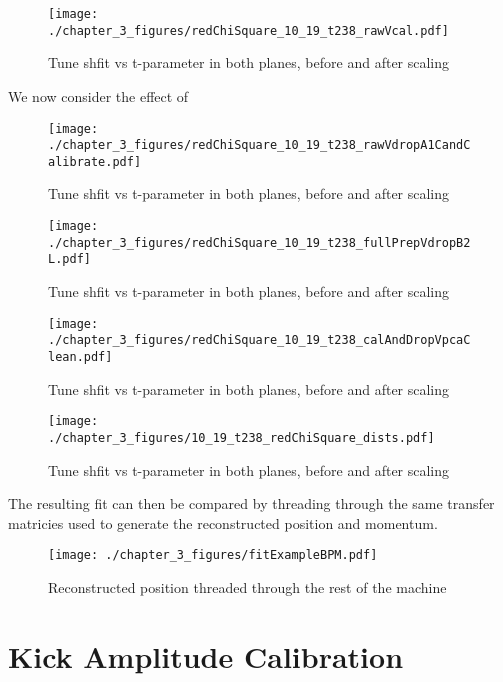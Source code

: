 \begin{figure}
    \centering
    \texttt{[image: ./chapter\_3\_figures/redChiSquare\_10\_19\_t238\_rawVcal.pdf]}
    \caption{Tune shfit vs t-parameter in both planes, before and after scaling}
    \label{fig:rawVcal}
\end{figure}

We now consider the effect of 

\begin{figure}
    \centering
    \texttt{[image: ./chapter\_3\_figures/redChiSquare\_10\_19\_t238\_rawVdropA1CandCalibrate.pdf]}
    \caption{Tune shfit vs t-parameter in both planes, before and after scaling}
    \label{fig:rawVA1C}
\end{figure}

\begin{figure}
    \centering
    \texttt{[image: ./chapter\_3\_figures/redChiSquare\_10\_19\_t238\_fullPrepVdropB2L.pdf]}
    \caption{Tune shfit vs t-parameter in both planes, before and after scaling}
    \label{fig:prepVB2L}
\end{figure}


\begin{figure}
    \centering
    \texttt{[image: ./chapter\_3\_figures/redChiSquare\_10\_19\_t238\_calAndDropVpcaClean.pdf]}
    \caption{Tune shfit vs t-parameter in both planes, before and after scaling}
    \label{fig:calVpca}
\end{figure}

\begin{figure}
    \centering
    \texttt{[image: ./chapter\_3\_figures/10\_19\_t238\_redChiSquare\_dists.pdf]}
    \caption{Tune shfit vs t-parameter in both planes, before and after scaling}
    \label{fig:redChiDists}
\end{figure}

The resulting fit can then be compared by threading through the same transfer matricies used to generate the reconstructed position and momentum.

\begin{figure}
    \centering
    \texttt{[image: ./chapter\_3\_figures/fitExampleBPM.pdf]}
    \caption{Reconstructed position threaded through the rest of the machine}
    \label{fig:fitThread}
\end{figure}

\section{Kick Amplitude Calibration} \label{sec:kickAmpCal}

